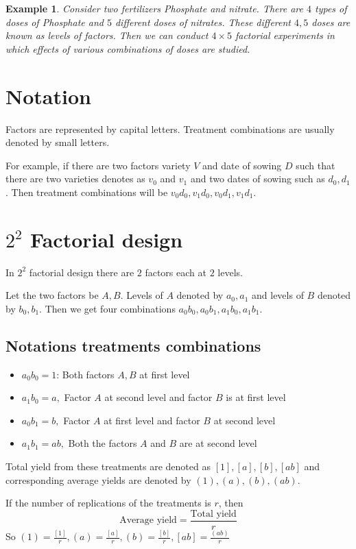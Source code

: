 \documentclass[oneside,11pt,pdftex]{book}%
\numberwithin{equation}{section}
\newtheorem{example}[theorem]{Example}
\numberwithin{section}{chapter}
\numberwithin{equation}{chapter}
\begin{document}
\begin{example}
	Consider two fertilizers Phosphate and nitrate. There are $ 4 $ types of doses of Phosphate and $ 5 $ different doses of nitrates. These different $ 4,5 $ doses are known as levels of factors. Then we can conduct $ 4 \times 5 $ factorial experiments in which effects of various combinations of doses are studied.
\end{example}

\section{Notation}
Factors are represented by capital letters. Treatment combinations are usually denoted by small letters. 

For example, if there are two factors variety $ V $ and date of sowing $ D $ such that there are two varieties denotes as $ v_0 $ and $ v_1 $ and two dates of sowing such as $ d_0, d_1 $. Then treatment combinations will be $ v_0d_0,v_1d_0,v_0d_1, v_1d_1$.

\section{$ 2^2 $ Factorial design}
In $ 2^2 $ factorial design there are $ 2 $ factors each at $ 2 $ levels. 

Let the two factors be $ A,B $. Levels of $ A $ denoted by $ a_0,a_1 $ and levels of $ B $ denoted by $ b_0,b_1 $. Then we get four combinations $ a_0b_0,a_0b_1,a_1b_0,a_1b_1 $.

\subsection{Notations treatments combinations}
\begin{itemize}
	\item $ a_0b_0=1 $: Both factors $ A,B $ at first level
	\item $ a_1b_0=a, $ Factor $ A $ at second level and factor $ B $ is at first level
	\item $ a_0b_1=b, $ Factor $ A $ at first level and factor $ B $ at second level
	\item $ a_1b_1=ab, $ Both the factors $ A $ and $ B $ are at second level
\end{itemize}
Total yield from these treatments are denoted as $ [1], [a], [b],[ab] $ and corresponding average yields are denoted by $ (1), (a),(b),(ab)$.

If the number of replications of the treatments is $ r $, then 
\[ \text{Average yield} =\frac{\text{Total yield}}{r}\]
So $ (1)=\frac{[1]}{r}, (a)=\frac{[a]}{r}, (b)=\frac{[b]}{r}, [ab]=\frac{(ab)}{r} $
\end{document}
